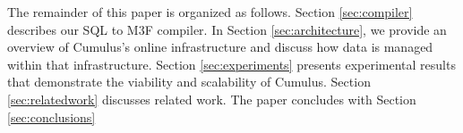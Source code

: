 The remainder of this paper is organized as follows.
Section \ref{sec:compiler} describes our SQL to M3F compiler.
In Section \ref{sec:architecture}, we provide an overview of Cumulus's online
infrastructure and discuss how data is managed within that infrastructure.
Section \ref{sec:experiments} presents
experimental results that demonstrate the viability and scalability of
Cumulus.
Section \ref{sec:relatedwork} discusses related work.
The paper concludes with Section \ref{sec:conclusions}




